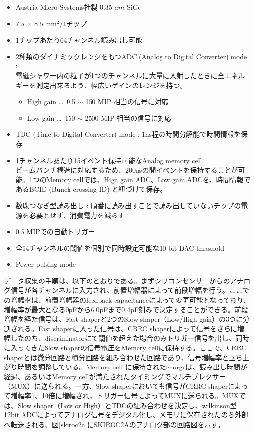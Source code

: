  \begin{itemize}
 	\item Austria Micro Systems社製 0.35 $\mu m$ SiGe
	\item 7.5 $\times$ 8.5 ${\mathrm{mm}^2} /1チップ$
	\item 1チップあたり64チャンネル読み出し可能
	\item 2種類のダイナミックレンジをもつADC (Analog to Digital Converter) mode :\\
		電磁シャワー内の粒子が1つのチャンネルに大量に入射したときに全エネルギーを測定出来るよう、幅広いゲインのレンジを持つ。
		\begin{itemize}
			\item High gain \ldots \ 0.5 $\sim$ 150 MIP 相当の信号に対応
			\item Low gain \ldots \ 150 $\sim$ 2500 MIP 相当の信号に対応
		\end{itemize}
	\item TDC (Time to Digital Converter) mode : 1ns程の時間分解能で時間情報を保存
	\item 1チャンネルあたり15イベント保持可能なAnalog memory cell\\
		ビームバンチ構造に対応するため、200nsの間イベントを保持することが可能。1つのMemory cellでは、High gain ADC、Low gain ADCを、時間情報であるBCID (Bunch crossing ID) と紐づけて保存。
	\item 数珠つなぎ型読み出し : 順番に読み出すことで読み出していないチップの電源を必要とせず、消費電力を減らす
	\item 0.5 MIPでの自動トリガー
	\item 全64チャンネルの閾値を個別で同時設定可能な10 bit DAC threshold
	\item Power pulsing mode
 \end{itemize}
データ収集の手順は、以下のとおりである。まずシリコンセンサーからのアナログ信号が各チャンネルに入力され、前置増幅器によって前段増幅を行う。ここでの増幅率は、前置増幅器のfeedback capacitanceによって変更可能となっており、増幅率が最大となる0pFから6.0pFまで0.4pF刻みで決定することができる。前段増幅を経た信号は、Fast shaperと2つのSlow shaper（Low/High gain）の3つに分割される。Fast shaperに入った信号は、CRRC shaperによって信号をさらに増幅したのち、discriminatorにて閾値を超えた場合のみトリガー信号を出し、同時に入ってきたSlow shaperの信号電圧をMemory cellに保持する。ここで、CRRC shaperとは微分回路と積分回路を組み合わせた回路であり、信号増幅率と立ち上がり時間を調整している。Memory cell に保持されたchargeは、読み出し時間が経過、あるいはMemory cellが満たされたタイミングでマルチプレクサー（MUX）に送られる。一方、Slow shaperにおいても信号がCRRC shaperによって増幅率1、10倍に増幅され、トリガー信号によってMUXに送られる。MUXでは、Slow shaper（Low or High）とTDCの組み合わせを決定し、wilkinson型12bit ADCによってアナログ信号をデジタル化し、メモリに保存されたのち外部へ転送される。図\ref{skiroc2a}にSKIROC2Aのアナログ部の回路図を示す。
